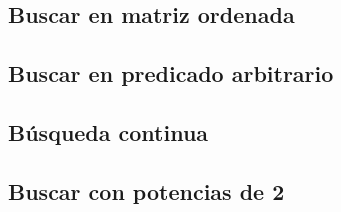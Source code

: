 \subsection{Buscar en matriz ordenada}


\subsection{Buscar en predicado arbitrario}


\subsection{Búsqueda continua}


\subsection{Buscar con potencias de 2}




